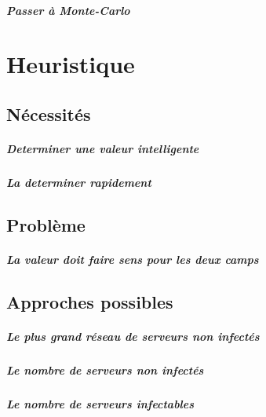 \documentclass{scrreprt}
\begin{document}
    \paragraph{Passer à Monte-Carlo}

    \chapter{Heuristique}

    \section{Nécessités}

    \paragraph{Determiner une valeur intelligente}

    \paragraph{La determiner rapidement}

    \section{Problème}

    \paragraph{La valeur doit faire sens pour les deux camps}

    \section{Approches possibles}

    \paragraph{Le plus grand réseau de serveurs non infectés}

    \paragraph{Le nombre de serveurs non infectés}

    \paragraph{Le nombre de serveurs infectables}
\end{document}

